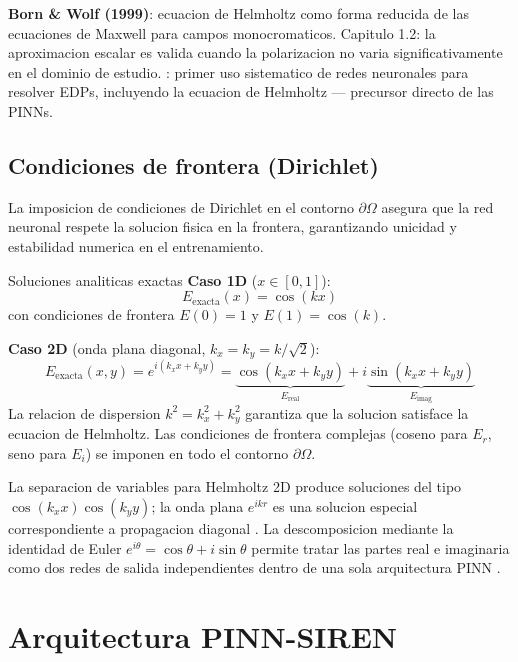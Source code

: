 \documentclass[12pt,a4paper]{article}
\begin{document}
\begin{litbox}
\textbf{Born \& Wolf (1999)}\nocite{bornwolf1999}: ecuacion de Helmholtz como
forma reducida de las ecuaciones de Maxwell para campos monocromaticos.
Capitulo 1.2: la aproximacion escalar es valida cuando la polarizacion no varia
significativamente en el dominio de estudio.
\textcite{lagaris1998}: primer uso sistematico de redes neuronales para resolver
EDPs, incluyendo la ecuacion de Helmholtz --- precursor directo de las PINNs.
\end{litbox}

\subsection{Condiciones de frontera (Dirichlet)}

La imposicion de condiciones de Dirichlet en el contorno $\partial\Omega$ asegura
que la red neuronal respete la solucion fisica en la frontera, garantizando
unicidad y estabilidad numerica en el entrenamiento.

\begin{definbox}{Soluciones analiticas exactas}
\textbf{Caso 1D} ($x \in [0,1]$):
\[
  E_\text{exacta}(x) = \cos(kx)
\]
con condiciones de frontera $E(0) = 1$ y $E(1) = \cos(k)$.

\textbf{Caso 2D} (onda plana diagonal, $k_x = k_y = k/\sqrt{2}$):
\[
  E_\text{exacta}(x,y) = e^{i(k_x x + k_y y)}
  = \underbrace{\cos(k_x x + k_y y)}_{E_\text{real}} +
    i\underbrace{\sin(k_x x + k_y y)}_{E_\text{imag}}
\]
La relacion de dispersion $k^2 = k_x^2 + k_y^2$ garantiza que la solucion
satisface la ecuacion de Helmholtz. Las condiciones de frontera complejas
(coseno para $E_r$, seno para $E_i$) se imponen en todo el contorno $\partial\Omega$.
\end{definbox}

\begin{litbox}
La separacion de variables para Helmholtz 2D produce soluciones del tipo
$\cos(k_x x)\cos(k_y y)$; la onda plana $e^{ikr}$ es una solucion especial
correspondiente a propagacion diagonal \parencite{bornwolf1999}.
La descomposicion mediante la identidad de Euler $e^{i\theta} = \cos\theta + i\sin\theta$
permite tratar las partes real e imaginaria como dos redes de salida independientes
dentro de una sola arquitectura PINN \parencite{raissi2019}.
\end{litbox}

\section{Arquitectura PINN-SIREN}
\end{document}
